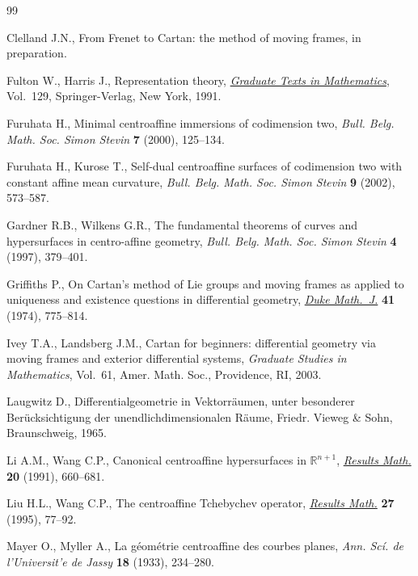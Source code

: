 \documentclass[10pt,a4paper]{amsart}
\numberwithin{equation}{section}
\theoremstyle{definition}
\begin{document}
\begin{thebibliography}{99}
\footnotesize \itemsep=0pt

Clelland J.N., From {F}renet to {C}artan: the method of moving frames, in
  preparation.

Fulton W., Harris J., Representation theory, \href{http://dx.doi.org/10.1007/978-1-4612-0979-9}{\textit{Graduate Texts in
  Mathematics}}, Vol.~129, Springer-Verlag, New York, 1991.

Furuhata H., Minimal centroaffine immersions of codimension two, \textit{Bull.
  Belg. Math. Soc. Simon Stevin} \textbf{7} (2000), 125--134.

Furuhata H., Kurose T., Self-dual centroaffine surfaces of codimension two with
  constant affine mean curvature, \textit{Bull. Belg. Math. Soc. Simon Stevin}
  \textbf{9} (2002), 573--587.

Gardner R.B., Wilkens G.R., The fundamental theorems of curves and
  hypersurfaces in centro-affine geo\-met\-ry, \textit{Bull. Belg. Math. Soc. Simon
  Stevin} \textbf{4} (1997), 379--401.

Griffiths P., On {C}artan's method of {L}ie groups and moving frames as applied
  to uniqueness and existence questions in differential geometry, \href{http://dx.doi.org/10.1215/S0012-7094-74-04180-5}{\textit{Duke
  Math.~J.}} \textbf{41} (1974), 775--814.

Ivey T.A., Landsberg J.M., Cartan for beginners: differential geometry via
  moving frames and exterior differential systems, \textit{Graduate Studies in
  Mathematics}, Vol.~61, Amer. Math. Soc., Providence, RI, 2003.

Laugwitz D., Differentialgeometrie in {V}ektorr\"aumen, unter besonderer
  {B}er\"ucksichtigung der unendlichdimensionalen {R}\"aume, Friedr. Vieweg \&
  Sohn, Braunschweig, 1965.

Li A.M., Wang C.P., Canonical centroaffine hypersurfaces in {${\mathbb
  R}^{n+1}$}, \href{http://dx.doi.org/10.1007/BF03323203}{\textit{Results Math.}} \textbf{20} (1991), 660--681.

Liu H.L., Wang C.P., The centroaffine {T}chebychev operator, \href{http://dx.doi.org/10.1007/BF03322271}{\textit{Results
  Math.}} \textbf{27} (1995), 77--92.

Mayer O., Myller A., La g\'eom\'etrie centroaffine des courbes planes,
  \textit{Ann. {S}c\'i. de l'{U}niversit'e de {J}assy} \textbf{18} (1933),
  234--280.


\end{thebibliography}
\end{document}

